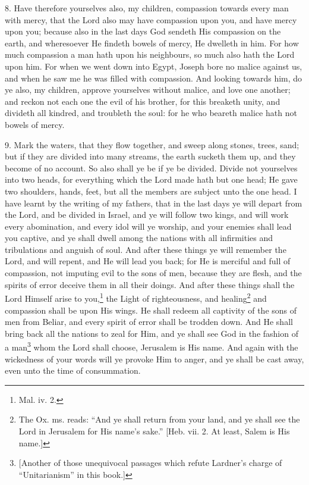 8. Have therefore yourselves also, my children, compassion towards every man with mercy, that the Lord also may have compassion upon you, and have mercy upon you; because also in the last days God sendeth His compassion on the earth, and wheresoever He findeth bowels of mercy, He dwelleth in him. For how much compassion a man hath upon his neighbours, so much also hath the Lord upon him. For when we went down into Egypt, Joseph bore no malice against us, and when he saw me he was filled with compassion. And looking towards him, do ye also, my children, approve yourselves without malice, and love one another; and reckon not each one the evil of his brother, for this breaketh unity, and divideth all kindred, and troubleth the soul: for he who beareth malice hath not bowels of mercy.

9. Mark the waters, that they flow together, and sweep along stones, trees, sand; but if they are divided into many streams, the earth sucketh them up, and they become of no account. So also shall ye be if ye be divided. Divide not yourselves into two heads, for everything which the Lord made hath but one head; He gave two shoulders, hands, feet, but all the members are subject unto the one head. I have learnt by the writing of my fathers, that in the last days ye will depart from the Lord, and be divided in Israel, and ye will follow two kings, and will work every abomination, and every idol will ye worship, and your enemies shall lead you captive, and ye shall dwell among the nations with all infirmities and tribulations and anguish of soul. And after these things ye will remember the Lord, and will repent, and He will lead you back; for He is merciful and full of compassion, not imputing evil to the sons of men, because they are flesh, and the spirits of error deceive them in all their doings. And after these things shall the Lord Himself arise to you,\footnote{Mal. iv. 2.} the Light of righteousness, and healing\footnote{The Ox. ms. reads: “And ye shall return from your land, and ye shall see the Lord in Jerusalem for His name’s sake.” [Heb. vii. 2. At least, Salem is His name.]} and compassion shall be upon His wings. He shall redeem all captivity of the sons of men from Beliar, and every spirit of error shall be trodden down. And He shall bring back all the nations to zeal for Him, and ye shall see God in the fashion of a man\footnote{[Another of those unequivocal passages which refute Lardner’s charge of “Unitarianism” in this book.]} whom the Lord shall choose, Jerusalem is His name. And again with the wickedness of your words will ye provoke Him to anger, and ye shall be cast away, even unto the time of consummation.

